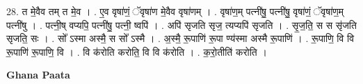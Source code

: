 \documentclass[17pt]{extarticle}
\begin{document}
28. त मे॒वैव तम् त मे॒व । . ए॒व वृषा॑णं॒ ॅवृषा॑ण मे॒वैव वृषा॑णम् । . वृषा॑ण॒म् पत्नी॑षु॒ पत्नी॑षु॒ वृषा॑णं॒ ॅवृषा॑ण॒म् पत्नी॑षु । . पत्नी॒ष् वप्यपि॒ पत्नी॑षु॒ पत्नी॒ ष्वपि॑ । . अपि॑ सृजति सृज॒ त्यप्यपि॑ सृजति । . सृ॒ज॒ति॒ स स सृ॑जति सृजति॒ सः । . सो᳚ ऽस्मा अस्मै॒ स सो᳚ ऽस्मै । . अ॒स्मै॒ रू॒पाणि॑ रू॒पा ण्य॑स्मा अस्मै रू॒पाणि॑ । . रू॒पाणि॒ वि वि रू॒पाणि॑ रू॒पाणि॒ वि । . वि क॑रोति करोति॒ वि वि क॑रोति । . क॒रो॒तीति॑ करोति । \newline

\textbf{Ghana Paata } \newline
\end{document}
